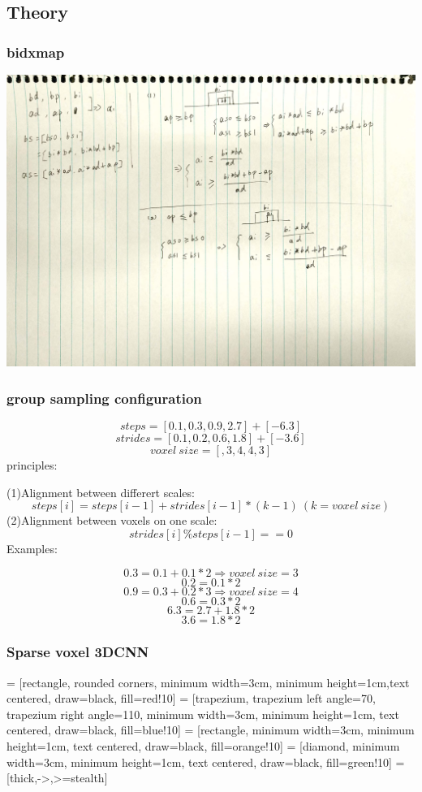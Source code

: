 \documentclass[,table,dvipsnames]{article}
\begin{document}
\subsection{Theory}
\subsubsection{bidxmap}
\includegraphics[width=\textheight]{theory/bxmap.png}

\subsubsection{group sampling configuration}
$$ steps = [0.1,0.3,0.9,2.7] + [-6.3]$$
$$ strides = [0.1,0.2,0.6,1.8] + [-3.6] $$
$$ voxel\ size=[, 3, 4, 4, 3] $$
principles:\par
(1)Alignment between differert scales:
$$ steps[i] = steps[i-1]+strides[i-1]*(k-1)\  (k=voxel\ size) $$
(2)Alignment between voxels on one scale:
$$ strides[i] \% steps[i-1] == 0 $$
Examples:\par
$$ 0.3=0.1+0.1*2 \Rightarrow voxel\ size=3 $$
$$ 0.2=0.1*2 $$
$$ 0.9=0.3+0.2*3 \Rightarrow voxel\ size=4 $$ 
$$ 0.6=0.3*2 $$
$$$$
$$ 6.3=2.7+1.8*2 $$
$$ 3.6=1.8*2 $$

\subsubsection{Sparse voxel 3DCNN }
 = [rectangle, rounded corners, minimum width=3cm, minimum height=1cm,text centered, draw=black, fill=red!10]
 = [trapezium, trapezium left angle=70, trapezium right angle=110, minimum width=3cm, minimum height=1cm, text centered, draw=black, fill=blue!10]
 = [rectangle, minimum width=3cm, minimum height=1cm, text centered, draw=black, fill=orange!10]
 = [diamond, minimum width=3cm, minimum height=1cm, text centered, draw=black, fill=green!10]
 = [thick,->,>=stealth]
\end{document}
